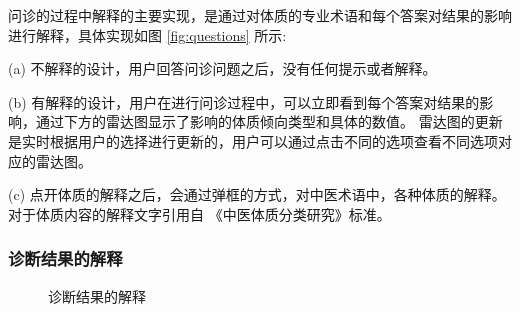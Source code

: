 问诊的过程中解释的主要实现，是通过对体质的专业术语和每个答案对结果的影响进行解释，具体实现如图 \ref{fig:questions} 所示:

(a) 不解释的设计，用户回答问诊问题之后，没有任何提示或者解释。

(b) 有解释的设计，用户在进行问诊过程中，可以立即看到每个答案对结果的影响，通过下方的雷达图显示了影响的体质倾向类型和具体的数值。
雷达图的更新是实时根据用户的选择进行更新的，用户可以通过点击不同的选项查看不同选项对应的雷达图。

(c) 点开体质的解释之后，会通过弹框的方式，对中医术语中，各种体质的解释。对于体质内容的解释文字引用自 《中医体质分类研究》标准。


\subsubsection{诊断结果的解释}
\begin{figure}[htbp]
    \centering
    \caption{诊断结果的解释}
    \label{fig:exp_result}
\end{figure}

